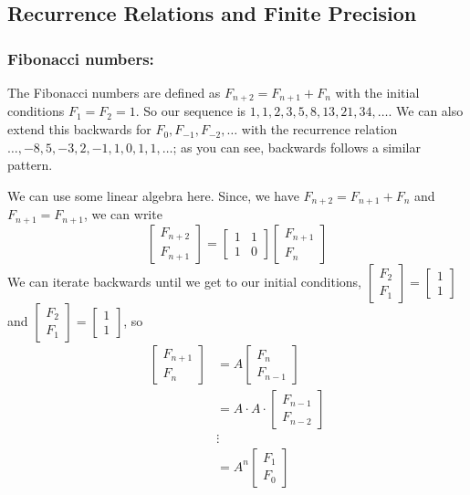 \documentclass{article}
\theoremstyle{plain}
\theoremstyle{remark}
\begin{document}
\subsection{Recurrence Relations and Finite Precision}

\subsubsection{Fibonacci numbers:}
The Fibonacci numbers are defined as $F_{n+2} = F_{n+1} + F_n$
with the initial conditions $F_1 = F_2 = 1$.
So our sequence is $1,1,2,3,5,8,13,21,34,\dots$.
We can also extend this backwards for $F_0, F_{-1}, F_{-2},\dots$
with the recurrence relation $\dots, -8, 5, -3, 2, -1, 1, 0, 1, 1, \dots$;
as you can see, backwards follows a similar pattern.

We can use some linear algebra here.
Since, we have $F_{n+2} = F_{n+1} + F_n$ and $F_{n+1} = F_{n+1}$,
we can write
\[
	\begin{bmatrix} F_{n+2} \\ F_{n+1} \end{bmatrix}
	= \begin{bmatrix} 1 & 1 \\ 1 & 0 \end{bmatrix}
	\begin{bmatrix} F_{n+1} \\ F_n \end{bmatrix}
\]
We can iterate backwards until we get to our initial conditions,
$\begin{bmatrix} F_2 \\ F_1 \end{bmatrix} = \begin{bmatrix} 1\\1\end{bmatrix}$
and $\begin{bmatrix} F_2 \\ F_1 \end{bmatrix} = \begin{bmatrix} 1\\1\end{bmatrix}$, so
\begin{align*}
	\begin{bmatrix} F_{n+1} \\ F_n \end{bmatrix}
	&= A \begin{bmatrix} F_n \\ F_{n-1} \end{bmatrix}\\
	&= A\cdot A \cdot \begin{bmatrix} F_{n-1} \\ F_{n-2} \end{bmatrix}\\
	&\vdots\\
	&= A^n \begin{bmatrix} F_1 \\ F_0 \end{bmatrix}
\end{align*}
\end{document}
